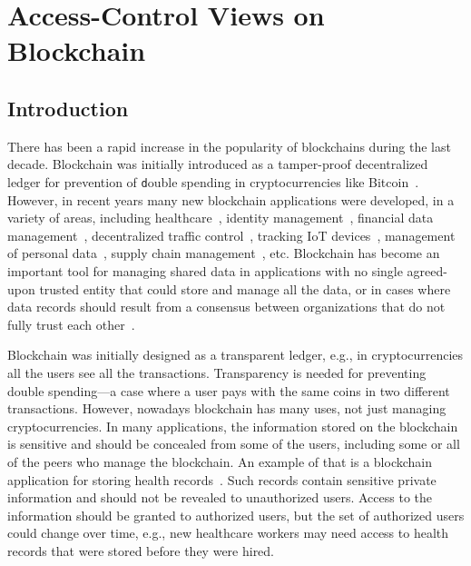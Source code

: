 \chapter{Access-Control Views on Blockchain}
\label{ch:view}


\section{Introduction}
\label{ch:view:intro}

There has been a rapid increase in the popularity of blockchains during the last decade. Blockchain was initially introduced as a tamper-proof decentralized ledger for prevention of {\texttt double spending\/} in cryptocurrencies like Bitcoin~\cite{nakamoto2019bitcoin}. However, in recent years many new blockchain applications were developed, in a variety of areas, including healthcare~\cite{dagher2018ancile}, identity management~\cite{dunphy2018first}, financial data management~\cite{guo2016blockchain,cocco2017banking,peters2016understanding,tapscott2017blockchain}, decentralized traffic control~\cite{dasu2018geofences}, tracking IoT devices~\cite{banafa2017iot}, management of personal data~\cite{zyskind2015decentralizing}, supply chain management~\cite{dujak2019blockchain,tse2017blockchain}, etc. Blockchain has become an important tool for managing shared data in applications with no single agreed-upon trusted entity that could store and manage all the data, or in cases where data records should result from a consensus between organizations that do not fully trust each other~\cite{gupta2021fault}.  

Blockchain was initially designed as a transparent ledger, e.g., in cryptocurrencies all the users see all the transactions. Transparency is needed for preventing double spending---a case where a user pays with the same coins in two different transactions. %
However, nowadays blockchain has many uses, not just managing cryptocurrencies. In many applications, the information stored on the blockchain is sensitive and should be concealed from some of the users, including some or all of the peers who manage the blockchain. An example of that is a blockchain application for storing health records~\cite{halamka2017potential}. Such records contain sensitive private information and should not be revealed to unauthorized users. Access to the information should be granted to authorized users, but the set of authorized users could change over time, e.g., new healthcare workers may need access to health records that were stored before they were hired. 

